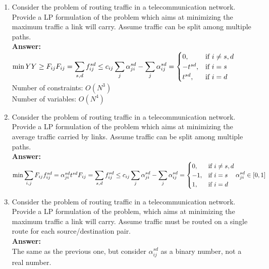 \documentclass[a4paper]{article}
\begin{document}
\begin{enumerate}
\item Consider the  problem  of  routing  traffic  in  a  telecommunication  network.  Provide a  LP  formulation  of  the  problem  which  aims  at  minimizing  the   maximum  traffic  a  link  will  carry.  Assume  traffic  can  be  split  among   multiple  paths.\\
\textbf{Answer:}\\
\begin{math}
\min{Y} \\
Y \ge F_{ij} \\
F_{ij} = \displaystyle\sum\limits_{s,d} {f_{ij}^{sd}} \le c_{ij}\\
\displaystyle\sum\limits_{j} {\alpha_{ji}^{sd}} - \displaystyle\sum\limits_{j} {\alpha_{ij}^{sd}} =
  \begin{cases}
  0, &\text{if $i \neq s, d$}\\
  -t^{sd}, &\text{if $i = s$}\\
  t^{sd}, &\text{if $i = d$}
  \end{cases} \\
\end{math}
Number of constraints: $O(N^3)$ \\
Number of variables: $O(N^4)$
\item Consider the problem of routing traffic in a telecommunication network. Provide a LP formulation of the problem which aims at minimizing the average traffic carried by links. Assume traffic can be split among multiple paths. \\
\textbf{Answer:}\\
\begin{math}
\min{\displaystyle\sum\limits_{i,j} F_{ij}} \\
f_{ij}^{sd} = \alpha_{ji}^{sd} t^{sd}\\
F_{ij} = \displaystyle\sum\limits_{s,d} {f_{ij}^{sd}} \le c_{ij}\\
\displaystyle\sum\limits_{j} {\alpha_{ji}^{sd}} - \displaystyle\sum\limits_{j} {\alpha_{ij}^{sd}} =
  \begin{cases}
  0, &\text{if $i \neq s, d$}\\
  -1, &\text{if $i = s$}\\
  1, &\text{if $i = d$}
  \end{cases} \\
\alpha_{ji}^{sd} \in [0,1] \\
\end{math}

\item Consider the problem of routing traffic in a telecommunication network. Provide a LP formulation of the problem, which aims at minimizing the maximum traffic a link will carry. Assume traffic must be routed on a single route for each source/destination pair.\\
\textbf{Answer:}\\
The same as the previous one, but consider $\alpha_{ij}^{sd}$ as a binary number, not a real number.


\end{enumerate}
\end{document}
